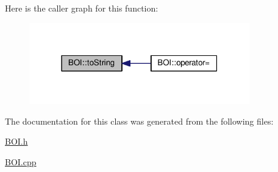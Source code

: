 Here is the caller graph for this function\+:\nopagebreak
\begin{figure}[H]
\begin{center}
\leavevmode
\includegraphics[width=271pt]{class_b_o_i_ab02a4dd4ebcc5b2abfaca19f2dff2006_icgraph}
\end{center}
\end{figure}




The documentation for this class was generated from the following files\+:\begin{DoxyCompactItemize}
\item 
\hyperlink{_b_o_i_8h}{B\+O\+I.\+h}\item 
\hyperlink{_b_o_i_8cpp}{B\+O\+I.\+cpp}\end{DoxyCompactItemize}
